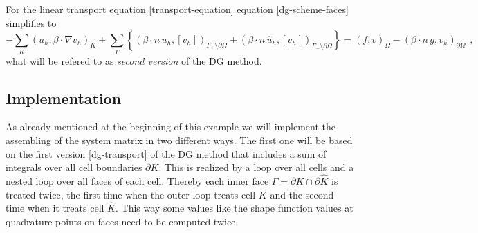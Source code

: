 \documentclass[11pt]{article}
\begin{document}
For the linear transport equation \eqref{transport-equation}
equation \eqref{dg-scheme-faces} simplifies to
\begin{equation}\label{dg-transport-gamma}
  -\sum_K(u_h,\beta\cdot\nabla v_h)_K+\sum_\Gamma\left\{(\beta\cdot n\, u_h, [v_h])_{\Gamma_+\setminus\partial\Omega}+(\beta\cdot n\, \hat u_h, [v_h])_{\Gamma_-\setminus\partial\Omega}\right\}=(f,v)_\Omega-(\beta\cdot n\, g, v_h)_{\partial\Omega_-},
\end{equation}
what will be refered to as \emph{second version} of the DG method.
\subsection{Implementation}
As already mentioned at the beginning of this example we will
implement the assembling of the system matrix in two different ways.
The first one will be based on the first version \eqref{dg-transport}
of the DG method that includes a sum of integrals over all cell
boundaries $\partial K$. This is realized by a loop over all cells and
a nested loop over all faces of each cell.  Thereby each inner face
$\Gamma=\partial K\cap\partial \hat K$ is treated twice, the first
time when the outer loop treats cell $K$ and the second time when it
treats cell $\hat K$. This way some values like the shape function
values at quadrature points on faces need to be computed twice.
\end{document}
